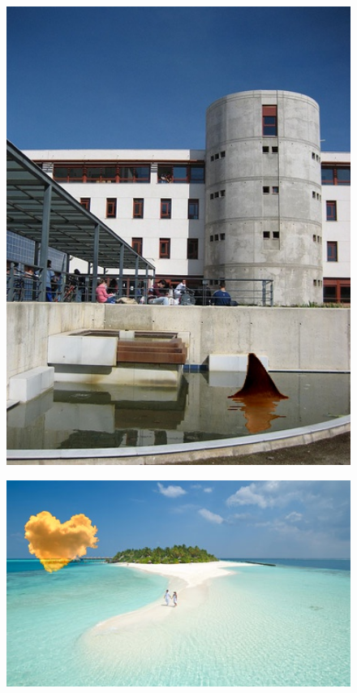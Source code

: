 \documentclass[oneside]{article}
\begin{document}
\begin{figure}[htbp]
\centering
\includegraphics[width=1\textwidth]{./img/mix_etsiit_aleta.jpg}
\caption{}
\label{fig:10}
\end{figure}

\begin{figure}[htbp]
\centering
\includegraphics[width=1\textwidth]{./img/mix_nubebn1mixed.jpg}
\caption{}
\label{fig:11}
\end{figure}


{}


\nocite{*}
\end{document}
